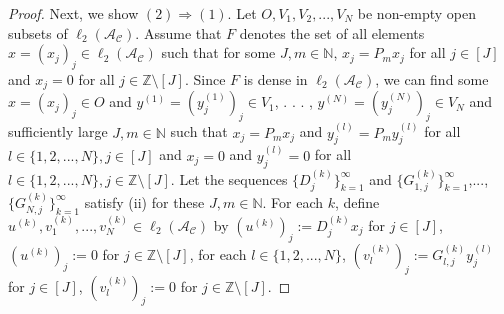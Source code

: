 \documentclass{article}
\begin{document}
\begin{proof}
	Next, we show $(2)\Rightarrow(1)$. Let $O, V_{1}, V_{2},..., V_{N}$ be non-empty open subsets of $\ell_{2}(\mathcal{A_{C}})$. Assume that $F$ denotes the set of all elements $x=(x_{j})_{j}\in \ell_{2}(\mathcal{A_{C}})$ such that for some $J,m\in \mathbb{N}$, $x_{j}=P_{m}x_{j}$ for all $j\in [J]$ and $x_{j}=0$ for all $j\in \mathbb{Z}\setminus [J]$. Since $F$ is dense in $\ell_{2}(\mathcal{A_{C}})$, we can find some $x=(x_{j})_{j}\in O$ and $y^{(1)}=(y^{(1)}_{j})_{j}\in V_{1}$, . . . , $y^{(N)}=(y^{(N)}_{j})_{j}\in V_{N}$ and sufficiently large $J, m\in\mathbb{N}$ such that $x_{j}=P_{m}x_{j}$ and $y^{(l)}_{j}=P_{m}y^{(l)}_{j}$ for all $l\in\{1,2,...,N\}, j\in[J]$ and $x_{j}=0$ and $y^{(l)}_{j}=0$ for all $l\in\{1,2,...,N\}, j\in \mathbb{Z}\setminus[J]$. Let the sequences $\{D^{(k)}_{j}\}^{\infty}_{k=1}$ and $\{G^{(k)}_{1,j}\}^{\infty}_{k=1}$,...,$\{G^{(k)}_{N,j}\}^{\infty}_{k=1}$ satisfy (ii) for these $J,m\in\mathbb{N}$. For each $k$, define $u^{(k)}, v^{(k)}_{1}, ..., v^{(k)}_{N}\in \ell_{2}(\mathcal{A_{C}})$ by $(u^{(k)})_{j}:=D^{(k)}_{j}x_{j}$ for $j\in[J]$, $(u^{(k)})_{j}:=0$ for $j\in \mathbb{Z}\setminus [J]$, for each $l\in\{1,2,...,N\}$, $(v^{(k)}_{l})_{j}:=G^{(k)}_{l, j}y^{(l)}_{j}$ for $j\in[J]$, $(v^{(k)}_{l})_{j}:=0$ for $j\in \mathbb{Z}\setminus [J]$.
	

\end{proof}
\end{document}
